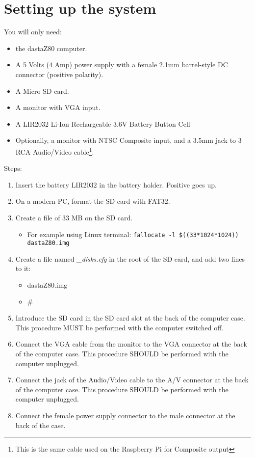 \section{Setting up the system}
\label{sec:setting_system}
You will only need:

\begin{itemize}
    \item the dastaZ80 computer.
    \item A 5 Volts (4 Amp) power supply with a female 2.1mm barrel-style DC
    connector (positive polarity).
    \item A Micro SD card.
    \item A monitor with VGA input.
    \item A LIR2032 Li-Ion Rechargeable 3.6V Battery Button Cell
    \item Optionally, a monitor with NTSC Composite input, and a 3.5mm jack
    to 3 RCA Audio/Video cable\footnote{This is the same cable used on the
    Raspberry Pi for Composite output}.
\end{itemize}

Steps:

\begin{enumerate}
    \item Insert the battery LIR2032 in the battery holder. Positive goes up.
    \item On a modern PC, format the SD card with FAT32.
    \item Create a file of 33 MB on the SD card.
    \begin{itemize}
        \item For example using Linux terminal: \texttt{fallocate -l \$((33*1024*1024)) dastaZ80.img}
    \end{itemize}
    \item Create a file named \textit{\_disks.cfg} in the root of the SD card,
    and add two lines to it:
    \begin{itemize}
        \item dastaZ80.img
        \item \#
    \end{itemize}
    \item Introduce the SD card in the SD card slot at the back of the
    computer case. This procedure MUST be performed with the computer
    switched off.
    \item Connect the VGA cable from the monitor to the VGA connector at the
    back of the computer case. This procedure SHOULD be performed with the
    computer unplugged.
    \item Connect the jack of the Audio/Video cable to the A/V connector at
    the back of the computer case. This procedure SHOULD be performed with
    the computer unplugged.
    \item Connect the female power supply connector to the male connector at
    the back of the case.
\end{enumerate}

